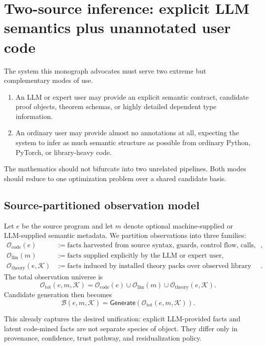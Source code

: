\documentclass[11pt]{article}
\theoremstyle{definition}
\theoremstyle{plain}
\begin{document}
\section{Two-source inference: explicit LLM semantics plus unannotated user code}

The system this monograph advocates must serve two extreme but complementary
modes of use.
\begin{enumerate}[label=\arabic*.]
  \item An LLM or expert user may provide an explicit semantic contract,
  candidate proof objects, theorem schemas, or highly detailed dependent type
  information.
  \item An ordinary user may provide almost no annotations at all, expecting the
  system to infer as much semantic structure as possible from ordinary Python,
  PyTorch, or library-heavy code.
\end{enumerate}
The mathematics should not bifurcate into two unrelated pipelines. Both modes
should reduce to one optimization problem over a shared candidate basis.

\subsection{Source-partitioned observation model}
Let $e$ be the source program and let $m$ denote optional machine-supplied or
LLM-supplied semantic metadata. We partition observations into three families:
\begin{align*}
\mathcal{O}_{\mathrm{code}}(e) &:= \text{facts harvested from source syntax,
guards, control flow, calls, and dataflow}, \\
\mathcal{O}_{\mathrm{llm}}(m) &:= \text{facts supplied explicitly by the LLM or
expert user}, \\
\mathcal{O}_{\mathrm{theory}}(e,\mathcal{K}) &:= \text{facts induced by installed
theory packs over observed library operations}.
\end{align*}
The total observation universe is
\[
\mathcal{O}_{\mathrm{tot}}(e,m,\mathcal{K})
= \mathcal{O}_{\mathrm{code}}(e)
\cup \mathcal{O}_{\mathrm{llm}}(m)
\cup \mathcal{O}_{\mathrm{theory}}(e,\mathcal{K}).
\]
Candidate generation then becomes
\[
\mathcal{B}(e,m,\mathcal{K})
= \mathsf{Generate}(\mathcal{O}_{\mathrm{tot}}(e,m,\mathcal{K})).
\]

This already captures the desired unification: explicit LLM-provided facts and
latent code-mined facts are not separate species of object. They differ only in
provenance, confidence, trust pathway, and residualization policy.
\end{document}
